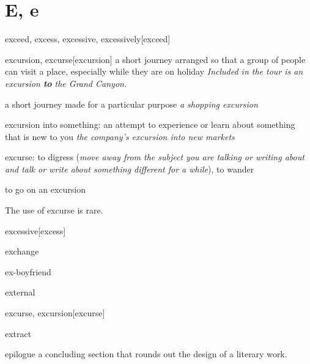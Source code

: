 \section{E, e}


\begin{DefWord}{exceed, excess, excessive, excessively}[exceed]
\end{DefWord}

\begin{DefWord}{excursion, excurse}[excursion]
    a short journey arranged so that a group of people can visit a place, especially while they are on holiday
    \textit{Included in the tour is an excursion \textbf{to} the Grand Canyon.}

    a short journey made for a particular purpose
    \textit{a shopping excursion}

    excursion into something: an attempt to experience or learn about something that is new to you
    \textit{the company's excursion into new markets}

    excurse: to digress (\textit{move away from the subject you are talking or writing about and talk or write about something different for a while}), to wander

    to go on an excursion
\end{DefWord}

\begin{remark}
    The use of excurse is rare.
\end{remark}

\begin{DefWord}{excessive}[excess]
\end{DefWord}

\begin{DefWord}{exchange}
\end{DefWord}

\begin{DefWord}{ex-boyfriend}
\end{DefWord}

\begin{DefWord}{external}
\end{DefWord}

\begin{DefWord}{excurse, excursion}[excurse]
\end{DefWord}

\begin{DefWord}{extract}
\end{DefWord}

\begin{DefWord}{epilogue}
    a concluding section that rounds out the design of a literary work.
\end{DefWord}

